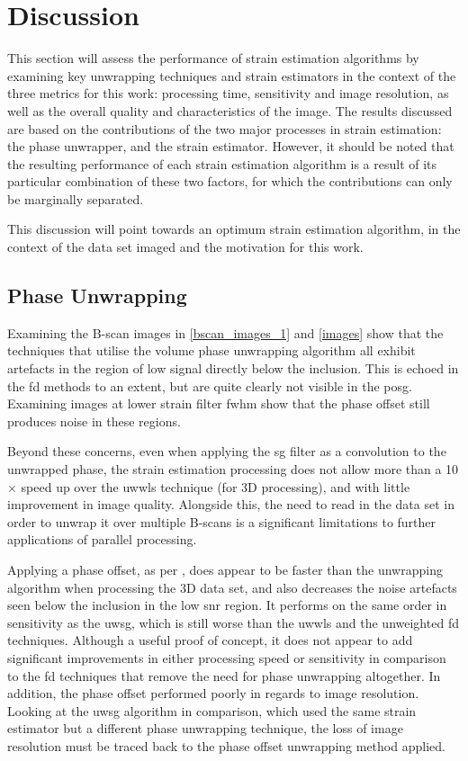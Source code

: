 \chapter{Discussion}

This section will assess the performance of strain estimation algorithms by examining key unwrapping techniques and strain estimators in the context of the three metrics for this work: processing time, sensitivity and image resolution, as well as the overall quality and characteristics of the image. 
The results discussed are based on the contributions of the two major processes in strain estimation: the phase unwrapper, and the strain estimator. However, it should be noted that the resulting performance of each strain estimation algorithm is a result of its particular combination of these two factors, for which the contributions can only be marginally separated.

This discussion will point towards an optimum strain estimation algorithm, in the context of the data set imaged and the motivation for this work. 

\section{Phase Unwrapping}

Examining the B-scan images in \autoref{bscan_images_1} and \autoref{images} show that the techniques that utilise the volume phase unwrapping algorithm all exhibit artefacts in the region of low signal directly below the inclusion. This is echoed in the \ac{fd} methods to an extent, but are quite clearly not visible in the \ac{posg}. Examining images at lower strain filter \ac{fwhm} show that the phase offset still produces noise in these regions. 

Beyond these concerns, even when applying the \ac{sg} filter as a convolution to the unwrapped phase, the strain estimation processing does not allow more than a 10$\times$ speed up over the \ac{uwwls} technique (for 3D processing), and with little improvement in image quality. Alongside this, the need to read in the data set in order to unwrap it over multiple B-scans is a significant limitations to further applications of parallel processing.

Applying a phase offset, as per \cite{zaitsev_hybrid_2016}, does appear to be faster than the unwrapping algorithm when processing the 3D data set, and also decreases the noise artefacts seen below the inclusion in the low \ac{snr} region. It performs on the same order in sensitivity as the \ac{uwsg}, which is still worse than the \ac{uwwls} and the unweighted \ac{fd} techniques. Although a useful proof of concept, it does not appear to add significant improvements in either processing speed or sensitivity in comparison to the \ac{fd} techniques that remove the need for phase unwrapping altogether. In addition, the phase offset performed poorly in regards to image resolution. Looking at the \ac{uwsg} algorithm in comparison, which used the same strain estimator but a different phase unwrapping technique, the loss of image resolution must be traced back to the phase offset unwrapping method applied.

